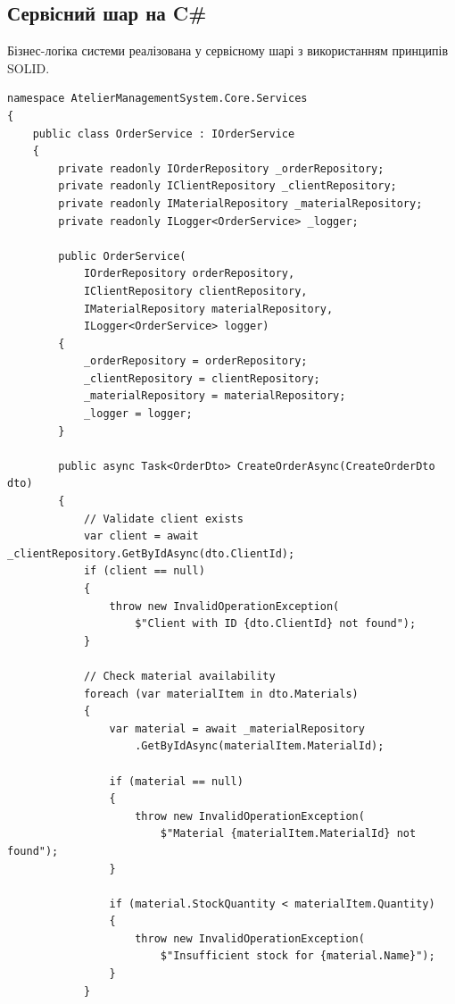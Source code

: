 \documentclass[14pt,a4paper]{extarticle}
\begin{document}
\newpage
\subsection{Сервісний шар на C\#}

Бізнес-логіка системи реалізована у сервісному шарі з використанням принципів SOLID.

\begin{lstlisting}[language={[Sharp]C}, caption=OrderService з бізнес-логікою, basicstyle=\small\ttfamily, breaklines=true, frame=single]
namespace AtelierManagementSystem.Core.Services
{
    public class OrderService : IOrderService
    {
        private readonly IOrderRepository _orderRepository;
        private readonly IClientRepository _clientRepository;
        private readonly IMaterialRepository _materialRepository;
        private readonly ILogger<OrderService> _logger;
        
        public OrderService(
            IOrderRepository orderRepository,
            IClientRepository clientRepository,
            IMaterialRepository materialRepository,
            ILogger<OrderService> logger)
        {
            _orderRepository = orderRepository;
            _clientRepository = clientRepository;
            _materialRepository = materialRepository;
            _logger = logger;
        }
        
        public async Task<OrderDto> CreateOrderAsync(CreateOrderDto dto)
        {
            // Validate client exists
            var client = await _clientRepository.GetByIdAsync(dto.ClientId);
            if (client == null)
            {
                throw new InvalidOperationException(
                    $"Client with ID {dto.ClientId} not found");
            }
            
            // Check material availability
            foreach (var materialItem in dto.Materials)
            {
                var material = await _materialRepository
                    .GetByIdAsync(materialItem.MaterialId);
                    
                if (material == null)
                {
                    throw new InvalidOperationException(
                        $"Material {materialItem.MaterialId} not found");
                }
                
                if (material.StockQuantity < materialItem.Quantity)
                {
                    throw new InvalidOperationException(
                        $"Insufficient stock for {material.Name}");
                }
            }
            

\end{lstlisting}
\end{document}
